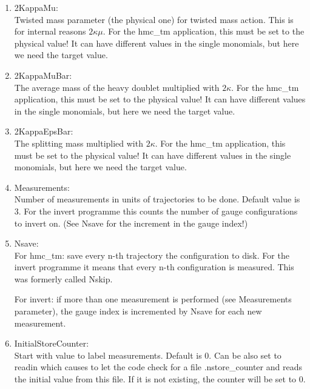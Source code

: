 \begin{enumerate}
\item {\ttfamily 2KappaMu}:\\
  Twisted mass parameter (the physical one) for twisted mass
  action. This is for internal reasons $2\kappa\mu$. For the {\ttfamily
    hmc\_tm} application, this must be set to the physical value! It
  can have different values in the single monomials, but here we need
  the target value.

\item {\ttfamily 2KappaMuBar}:\\
  The average mass of the heavy doublet multiplied with $2\kappa$. For
  the {\ttfamily hmc\_tm} application, this must be set to the physical value! It
  can have different values in the single monomials, but here we need
  the target value.

\item {\ttfamily 2KappaEpsBar}:\\
  The splitting mass multiplied with $2\kappa$. For the {\ttfamily
    hmc\_tm} application, this must be set to the physical value! It
  can have different values in the single monomials, but here we need
  the target value.

\item {\ttfamily Measurements}:\\
  Number of measurements in units of trajectories to be done. Default
  value is $3$. For the {\ttfamily invert} programme this counts the
  number of gauge configurations to invert on. (See {\ttfamily Nsave}
  for the increment in the gauge index!)

\item {\ttfamily Nsave}:\\
  For {\ttfamily hmc\_tm}: save every n-th trajectory the
  configuration to disk. 
  For the {\ttfamily invert} programme it means that every n-th
  configuration is measured. This was formerly called {\ttfamily
    Nskip}.
  
  For {\ttfamily invert}: if more than one measurement is performed
  (see {\ttfamily Measurements} parameter),
  the gauge index is incremented by {\ttfamily Nsave} for each new
  measurement. 

\item {\ttfamily InitialStoreCounter}:\\
  Start with value to label measurements. Default is $0$. Can be also
  set to {\ttfamily readin} which causes to let the code check for a
  file {\ttfamily .nstore\_counter} and reads the initial value from
  this file. If it is not existing, the counter will be set to $0$.


\end{enumerate}
